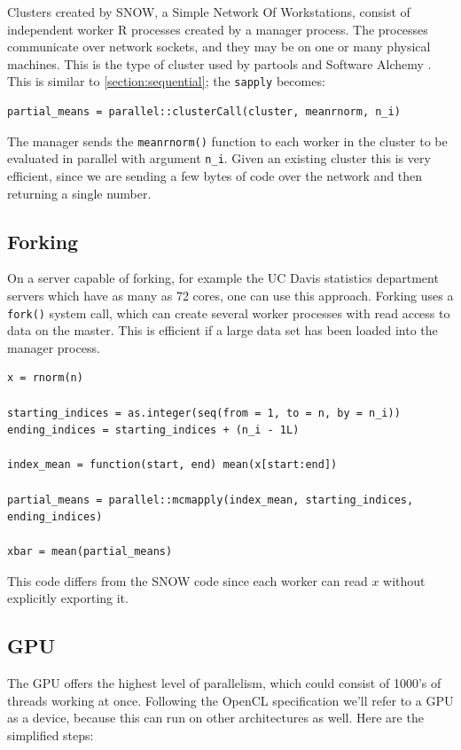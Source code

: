 \documentclass[12pt]{article}
\begin{document}
Clusters created by SNOW, a Simple Network Of Workstations,
consist of independent worker R processes created by a manager process. The
processes communicate over network sockets, and they may be on one or many
physical machines.  This is the type of cluster used by partools and
Software Alchemy \cite{R-partools} \cite{matloff2014software}.  This is
similar to \ref{section:sequential}; the \texttt{sapply}
becomes:

\begin{verbatim}
partial_means = parallel::clusterCall(cluster, meanrnorm, n_i)
\end{verbatim}

The manager sends the \texttt{meanrnorm()} function to each worker in the
cluster to be evaluated in parallel with argument \texttt{n\_i}.  Given an
existing cluster this is very efficient, since we are sending a few bytes
of code over the network and then returning a single number.

\subsection{Forking}

On a server capable of forking, for example the UC Davis statistics
department servers which have as many as 72 cores, one can use this
approach. Forking uses a \texttt{fork()} system call, which can create
several worker processes with read access to data on the master. This is
efficient if a large data set has been loaded into the manager process.

\begin{verbatim}
x = rnorm(n)

starting_indices = as.integer(seq(from = 1, to = n, by = n_i))
ending_indices = starting_indices + (n_i - 1L)

index_mean = function(start, end) mean(x[start:end])

partial_means = parallel::mcmapply(index_mean, starting_indices, ending_indices)

xbar = mean(partial_means)
\end{verbatim}

This code differs from the SNOW code since each worker can read $x$ without
explicitly exporting it.

\subsection{GPU}

The GPU offers the highest level of parallelism, which could consist of
1000's of threads working at once. Following the OpenCL specification we'll
refer to a GPU as a device, because this can run on other architectures as
well. Here are the simplified steps:
\end{document}
